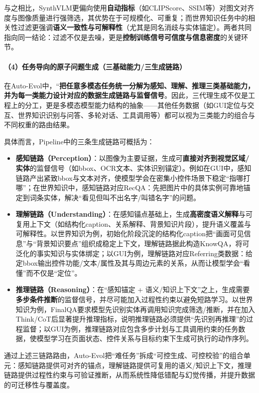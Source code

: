 与之相比，SynthVLM更偏向使用\textbf{自动指标}（如CLIPScore、SSIM等）对图文对齐度与图像质量进行强筛选\citep{liu2025synthvlm,hessel2021clipscore,wang2004ssim}，其优势在于可规模化、可重复；而世界知识任务中的相关性过滤更强调\textbf{语义一致性与可解释性}（尤其是同名消歧与实体锚定）。两者共同指向同一结论：过滤不仅是去噪，更是\textbf{控制训练信号可信度与信息密度}的关键环节。

\paragraph{（4）任务导向的原子问题生成（三基础能力/三生成链路）}
在Auto-Evol中，“\textbf{把任意多模态任务统一分解为感知、理解、推理三类基础能力，并为每一类能力设计对应的数据生成链路与监督信号}。因此，三代理生成不仅是工程上的分工，更是多模态模型能力结构的抽象——其他任务数据（如GUI定位与交互、世界知识识别与问答、多轮对话、工具调用等）都可以视为三类能力的组合与不同权重的路由结果。

具体而言，Pipeline中的三条生成链路可概括为：
\begin{itemize}
  \item \textbf{感知链路（Perception）}：以图像为主要证据，生成可\textbf{直接对齐到视觉区域/实体}的监督信号（如bbox、OCR文本、实体识别锚定）。例如在GUI中，感知链路产出紧致bbox与文本对齐，使模型学会在密集小控件场景下稳定“指哪打哪”；在世界知识中，感知链路对应RecQA：先把图片中的具体实例可靠地锚定到词条实体，解决“看见但叫不出名字/叫错名字”的问题。
  \item \textbf{理解链路（Understanding）}：在感知锚点基础上，生成\textbf{高密度语义解释}与可复用上下文（如结构化caption、关系解释、背景知识片段），提升语义覆盖与可解释性。以世界知识为例，初始化阶段沉淀的结构化caption把“画面可见信息”与“背景知识要点”组织成稳定上下文，理解链路据此构造KnowQA，将可泛化的事实知识与实体绑定；以GUI为例，理解链路对应Referring类数据：给定bbox输出控件功能/文本/属性及其与周边元素的关系，从而让模型学会“看懂”而不仅是“定位”。
  \item \textbf{推理链路（Reasoning）}：在“感知锚定 + 语义/知识上下文”之上，生成需要\textbf{多步条件推断}的监督信号，并尽可能加入过程性约束以避免短路学习。以世界知识为例，FinalQA要求模型先识别实体再调用知识完成筛选/推断，并在加入Think/CoT后显著提升推理指标，说明推理链路必须提供“先识别再推理”的过程监督；以GUI为例，推理链路对应包含多步计划与工具调用约束的任务数据，使模型学习在页面状态、控件关系与目标约束下生成可执行的动作序列。
\end{itemize}
通过上述三链路路由，Auto-Evol把“难任务”拆成“可控生成、可控校验”的组合单元：感知链路提供可对齐的锚点，理解链路提供可复用的语义/知识上下文，推理链路提供过程性约束与可验证推断，从而系统性降低错配与幻觉传播，并提升数据的可迁移性与覆盖度。


